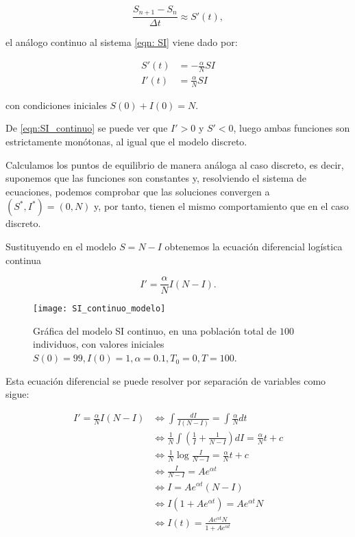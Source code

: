 $$\frac{S_{n+1} - S_n}{\Delta t} \approx S'(t),$$

el análogo continuo al sistema \eqref{eqn: SI} viene dado por:

\begin{equation}
\label{eqn:SI_continuo}
\begin{aligned}
S'(t) & = -\frac{\alpha}{N}SI \\
I'(t) & = \frac{\alpha}{N}SI
\end{aligned}
\end{equation}

con condiciones iniciales $S(0)+I(0)=N$.

De \eqref{eqn:SI_continuo} se puede ver que $I'>0$ y $S'<0$, luego ambas funciones son estrictamente monótonas, al igual que el modelo discreto.

Calculamos los puntos de equilibrio de manera análoga al caso discreto, es decir, suponemos que las funciones son constantes y, resolviendo el sistema de ecuaciones, podemos comprobar que las soluciones convergen a $(S^*,I^*)=(0,N)$ y, por tanto, tienen el mismo comportamiento que en el caso discreto.

Sustituyendo en el modelo $S=N-I$ obtenemos la ecuación diferencial logística continua

$$I' = \frac{\alpha}{N}I(N-I).$$

\begin{figure}
\begin{center}
\caption{Gráfica del modelo SI continuo, en una población total de $100$ individuos, con valores iniciales $S(0)=99, I(0) = 1, \alpha = 0.1,T_0 = 0, T = 100$.}
\label{fig: SI_continuo}
\texttt{[image: SI\_continuo\_modelo]}
\end{center}
\end{figure}

Esta ecuación diferencial se puede resolver por separación de variables como sigue:

\begin{equation}
\begin{aligned}
I'=\frac{\alpha}{N}I(N-I) & \Leftrightarrow \int \frac{dI}{I(N-I)} = \int \frac{\alpha}{N} dt \\
& \Leftrightarrow \frac{1}{N}\int \left(\frac{1}{I}+\frac{1}{N-I}\right) dI = \frac{\alpha}{N}t+c \\
& \Leftrightarrow  \frac{1}{N}\log{\frac{I}{N-I}} = \frac{\alpha}{N}t+c \\
& \Leftrightarrow  \frac{I}{N-I} = Ae^{\alpha t} \\
& \Leftrightarrow  I = Ae^{\alpha t}(N-I) \\
& \Leftrightarrow  I(1+Ae^{\alpha t}) = Ae^{\alpha t}N \\
& \Leftrightarrow  I(t) = \frac{Ae^{\alpha t}N}{1+Ae^{\alpha t} }
\end{aligned}
\end{equation}

